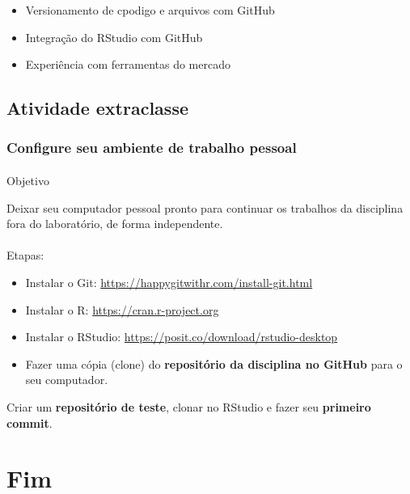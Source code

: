 \documentclass[
  letterpaper,
  DIV=11,
  numbers=noendperiod]{scrartcl}
\makeatletter
\let\oldparagraph\paragraph
\renewcommand{\paragraph}{
    \@ifstar
      \xxxParagraphStar
      \xxxParagraphNoStar
  }
\newcommand{\xxxParagraphStar}[1]{\oldparagraph*{#1}\mbox{}}
\newcommand{\xxxParagraphNoStar}[1]{\oldparagraph{#1}\mbox{}}
\makeatother
\begin{document}
\begin{itemize}
\item
  Versionamento de cpodigo e arquivos com GitHub
\item
  Integração do RStudio com GitHub
\item
  Experiência com ferramentas do mercado
\end{itemize}

\subsection{Atividade extraclasse}\label{atividade-extraclasse}

\subsubsection{Configure seu ambiente de trabalho
pessoal}\label{configure-seu-ambiente-de-trabalho-pessoal}

\paragraph{Objetivo}\label{objetivo}

Deixar seu computador pessoal pronto para continuar os trabalhos da
disciplina fora do laboratório, de forma independente.

\paragraph{Etapas:}\label{etapas}

\begin{itemize}
\item
  Instalar o Git: \url{https://happygitwithr.com/install-git.html}
\item
  Instalar o R: \url{https://cran.r-project.org}
\item
  Instalar o RStudio: \url{https://posit.co/download/rstudio-desktop}
\item
  Fazer uma cópia (clone) do \textbf{repositório da disciplina no
  GitHub} para o seu computador.
\end{itemize}

Criar um \textbf{repositório de teste}, clonar no RStudio e fazer seu
\textbf{primeiro commit}.

\section{Fim}\label{fim}
\end{document}

